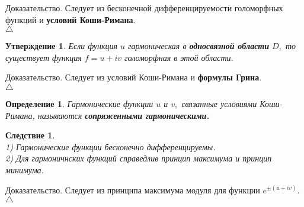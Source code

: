 \documentclass[12 pt, a4 paper]{article}
\theoremstyle{plain}   \newtheorem{Pro}{Задача}
\newtheorem{Sta}{Утверждение}
\newtheorem{Def}{Определение}
\newtheorem{Cor}{Следствие}
\begin{document}
{\Large Доказательство.}
Следует из бесконечной дифференцируемости голоморфных
функций и
{\bfseries условий Коши-Римана}.
\\
$ \triangle $
\begin{Sta}
Если функция
$ u $
гармоническая в
{\bfseries односвязной области}
$ D , $
то существует функция
$ f=u+iv $
голоморфная в этой области.
\end{Sta}
{\Large Доказательство.}
Следует из условий Коши-Римана и
{\bfseries формулы Грина}.
\\
$ \triangle $
\begin{Def}
Гармонические функции
$ u $
и
$ v , $
связанные условиями Коши-Римана, называются
{\bfseries сопряженными гармоническими.}
\end{Def}
\begin{Cor}
$ \; $\\
1) Гармонические функции бесконечно дифференцируемы. \\
2) Для гармоничнских функций справедлив принцип
максимума и принцип минимума.
\end{Cor}
{\Large Доказательство.}
Следует из принципа максимума модуля для функции
$ e^{\pm (u+iv)}. $
\\
$ \triangle $
\\
\end{document}
